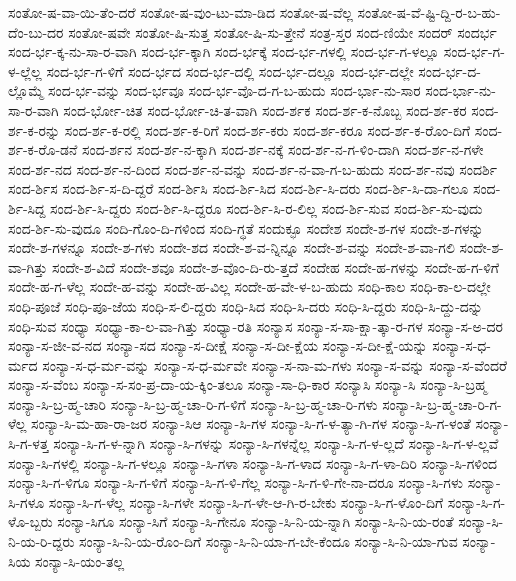 {ಸಂತೋ-ಷ-ವಾ-ಯಿ-ತೆಂ-ದರೆ
ಸಂತೋ-ಷ-ವುಂ-ಟು-ಮಾ-ಡಿದ
ಸಂತೋ-ಷ-ವೆಲ್ಲ
ಸಂತೋ-ಷ-ವೆ-ಷ್ಟಿ-ದ್ದಿ-ರ-ಬ-ಹು-ದೆಂ-ಬು-ದರ
ಸಂತೋ-ಷವೇ
ಸಂತೋ-ಷಿ-ಸುತ್ತ
ಸಂತೋ-ಷಿ-ಸು-ತ್ತೇನೆ
ಸಂತ್ರ-ಸ್ತರ
ಸಂದ-ಣಿಯೇ
ಸಂದರ್
ಸಂದರ್ಭ
ಸಂದ-ರ್ಭ-ಕ್ಕ-ನು-ಸಾ-ರ-ವಾಗಿ
ಸಂದ-ರ್ಭ-ಕ್ಕಾಗಿ
ಸಂದ-ರ್ಭಕ್ಕೆ
ಸಂದ-ರ್ಭ-ಗಳಲ್ಲಿ
ಸಂದ-ರ್ಭ-ಗ-ಳಲ್ಲೂ
ಸಂದ-ರ್ಭ-ಗ-ಳ-ಲ್ಲೆಲ್ಲ
ಸಂದ-ರ್ಭ-ಗ-ಳಿಗೆ
ಸಂದ-ರ್ಭದ
ಸಂದ-ರ್ಭ-ದಲ್ಲಿ
ಸಂದ-ರ್ಭ-ದಲ್ಲೂ
ಸಂದ-ರ್ಭ-ದಲ್ಲೇ
ಸಂದ-ರ್ಭ-ದ-ಲ್ಲೊಮ್ಮೆ
ಸಂದ-ರ್ಭ-ವನ್ನು
ಸಂದ-ರ್ಭವೂ
ಸಂದ-ರ್ಭ-ವೊ-ದ-ಗ-ಬ-ಹುದು
ಸಂದ-ರ್ಭಾ-ನು-ಸಾರ
ಸಂದ-ರ್ಭಾ-ನು-ಸಾ-ರ-ವಾಗಿ
ಸಂದ-ರ್ಭೋ-ಚಿತ
ಸಂದ-ರ್ಭೋ-ಚಿ-ತ-ವಾಗಿ
ಸಂದ-ರ್ಶಕ
ಸಂದ-ರ್ಶ-ಕ-ನೊಬ್ಬ
ಸಂದ-ರ್ಶ-ಕರ
ಸಂದ-ರ್ಶ-ಕ-ರನ್ನು
ಸಂದ-ರ್ಶ-ಕ-ರಲ್ಲಿ
ಸಂದ-ರ್ಶ-ಕ-ರಿಗೆ
ಸಂದ-ರ್ಶ-ಕರು
ಸಂದ-ರ್ಶ-ಕರೂ
ಸಂದ-ರ್ಶ-ಕ-ರೊಂ-ದಿಗೆ
ಸಂದ-ರ್ಶ-ಕ-ರೊ-ಡನೆ
ಸಂದ-ರ್ಶನ
ಸಂದ-ರ್ಶ-ನ-ಕ್ಕಾಗಿ
ಸಂದ-ರ್ಶ-ನಕ್ಕೆ
ಸಂದ-ರ್ಶ-ನ-ಗ-ಳಿಂ-ದಾಗಿ
ಸಂದ-ರ್ಶ-ನ-ಗಳೇ
ಸಂದ-ರ್ಶ-ನದ
ಸಂದ-ರ್ಶ-ನ-ದಿಂದ
ಸಂದ-ರ್ಶ-ನ-ವನ್ನು
ಸಂದ-ರ್ಶ-ನ-ವಾ-ಗ-ಬ-ಹುದು
ಸಂದ-ರ್ಶ-ನವು
ಸಂದರ್ಶಿ
ಸಂದ-ರ್ಶಿಸ
ಸಂದ-ರ್ಶಿ-ಸ-ದಿ-ದ್ದರೆ
ಸಂದ-ರ್ಶಿಸಿ
ಸಂದ-ರ್ಶಿ-ಸಿದ
ಸಂದ-ರ್ಶಿ-ಸಿ-ದರು
ಸಂದ-ರ್ಶಿ-ಸಿ-ದಾ-ಗಲೂ
ಸಂದ-ರ್ಶಿ-ಸಿದ್ದ
ಸಂದ-ರ್ಶಿ-ಸಿ-ದ್ದರು
ಸಂದ-ರ್ಶಿ-ಸಿ-ದ್ದರೂ
ಸಂದ-ರ್ಶಿ-ಸಿ-ರ-ಲಿಲ್ಲ
ಸಂದ-ರ್ಶಿ-ಸುವ
ಸಂದ-ರ್ಶಿ-ಸು-ವುದು
ಸಂದ-ರ್ಶಿ-ಸು-ವುದೂ
ಸಂದಿ-ಗೊಂ-ದಿ-ಗಳಿಂದ
ಸಂದಿ-ಗ್ಧತೆ
ಸಂದುಕ್ಫೂ
ಸಂದೇಶ
ಸಂದೇ-ಶ-ಗಳ
ಸಂದೇ-ಶ-ಗಳನ್ನು
ಸಂದೇ-ಶ-ಗಳನ್ನೂ
ಸಂದೇ-ಶ-ಗಳು
ಸಂದೇ-ಶದ
ಸಂದೇ-ಶ-ವ-ನ್ನಿನ್ನೂ
ಸಂದೇ-ಶ-ವನ್ನು
ಸಂದೇ-ಶ-ವಾ-ಗಲಿ
ಸಂದೇ-ಶ-ವಾ-ಗಿತ್ತು
ಸಂದೇ-ಶ-ವಿದೆ
ಸಂದೇ-ಶವೂ
ಸಂದೇ-ಶ-ವೊಂ-ದಿ-ರು-ತ್ತದೆ
ಸಂದೇಹ
ಸಂದೇ-ಹ-ಗಳನ್ನು
ಸಂದೇ-ಹ-ಗ-ಳಿಗೆ
ಸಂದೇ-ಹ-ಗ-ಳೆಲ್ಲ
ಸಂದೇ-ಹ-ವನ್ನು
ಸಂದೇ-ಹ-ವಿಲ್ಲ
ಸಂದೇ-ಹ-ವೇ-ಳ-ಬ-ಹುದು
ಸಂಧಿ-ಕಾಲ
ಸಂಧಿ-ಕಾ-ಲ-ದಲ್ಲೇ
ಸಂಧಿ-ಪೂಜೆ
ಸಂಧಿ-ಪೂ-ಜೆಯ
ಸಂಧಿ-ಸ-ಲಿ-ದ್ದರು
ಸಂಧಿ-ಸಿದ
ಸಂಧಿ-ಸಿ-ದರು
ಸಂಧಿ-ಸಿ-ದ್ದರು
ಸಂಧಿ-ಸಿ-ದ್ದು-ದನ್ನು
ಸಂಧಿ-ಸುವ
ಸಂಧ್ಯಾ
ಸಂಧ್ಯಾ-ಕಾ-ಲ-ವಾ-ಗಿತ್ತು
ಸಂಧ್ಯಾ-ರತಿ
ಸಂನ್ಯಾಸ
ಸಂನ್ಯಾ-ಸ-ಸಾ-ಕ್ಷಾ-ತ್ಕಾ-ರ-ಗಳ
ಸಂನ್ಯಾ-ಸ-ಅ-ದರ
ಸಂನ್ಯಾ-ಸ-ಜೀ-ವ-ನದ
ಸಂನ್ಯಾ-ಸದ
ಸಂನ್ಯಾ-ಸ-ದೀಕ್ಷೆ
ಸಂನ್ಯಾ-ಸ-ದೀ-ಕ್ಷೆಯ
ಸಂನ್ಯಾ-ಸ-ದೀ-ಕ್ಷೆ-ಯನ್ನು
ಸಂನ್ಯಾ-ಸ-ಧ-ರ್ಮದ
ಸಂನ್ಯಾ-ಸ-ಧ-ರ್ಮ-ವನ್ನು
ಸಂನ್ಯಾ-ಸ-ಧ-ರ್ಮವೇ
ಸಂನ್ಯಾ-ಸ-ನಾ-ಮ-ಗಳು
ಸಂನ್ಯಾ-ಸ-ವನ್ನು
ಸಂನ್ಯಾ-ಸ-ವೆಂದರೆ
ಸಂನ್ಯಾ-ಸ-ವೆಂಬ
ಸಂನ್ಯಾ-ಸ-ಸಂ-ಪ್ರ-ದಾ-ಯ-ಕ್ಕಿಂ-ತಲೂ
ಸಂನ್ಯಾ-ಸಾ-ಧಿ-ಕಾರ
ಸಂನ್ಯಾಸಿ
ಸಂನ್ಯಾ-ಸಿ
ಸಂನ್ಯಾ-ಸಿ-ಬ್ರಹ್ಮ
ಸಂನ್ಯಾ-ಸಿ-ಬ್ರ-ಹ್ಮ-ಚಾರಿ
ಸಂನ್ಯಾ-ಸಿ-ಬ್ರ-ಹ್ಮ-ಚಾ-ರಿ-ಗ-ಳಿಗೆ
ಸಂನ್ಯಾ-ಸಿ-ಬ್ರ-ಹ್ಮ-ಚಾ-ರಿ-ಗಳು
ಸಂನ್ಯಾ-ಸಿ-ಬ್ರ-ಹ್ಮ-ಚಾ-ರಿ-ಗ-ಳೆಲ್ಲ
ಸಂನ್ಯಾ-ಸಿ-ಮ-ಹಾ-ರಾ-ಜರ
ಸಂನ್ಯಾ-ಸಿಆ
ಸಂನ್ಯಾ-ಸಿ-ಗಳ
ಸಂನ್ಯಾ-ಸಿ-ಗ-ಳ-ತ್ಯಾ-ಗಿ-ಗಳ
ಸಂನ್ಯಾ-ಸಿ-ಗ-ಳಂತೆ
ಸಂನ್ಯಾ-ಸಿ-ಗ-ಳತ್ತ
ಸಂನ್ಯಾ-ಸಿ-ಗ-ಳ-ನ್ನಾಗಿ
ಸಂನ್ಯಾ-ಸಿ-ಗಳನ್ನು
ಸಂನ್ಯಾ-ಸಿ-ಗಳನ್ನೆಲ್ಲ
ಸಂನ್ಯಾ-ಸಿ-ಗ-ಳ-ಲ್ಲದೆ
ಸಂನ್ಯಾ-ಸಿ-ಗ-ಳ-ಲ್ಲವೆ
ಸಂನ್ಯಾ-ಸಿ-ಗಳಲ್ಲಿ
ಸಂನ್ಯಾ-ಸಿ-ಗ-ಳಲ್ಲೂ
ಸಂನ್ಯಾ-ಸಿ-ಗಳಾ
ಸಂನ್ಯಾ-ಸಿ-ಗ-ಳಾದ
ಸಂನ್ಯಾ-ಸಿ-ಗ-ಳಾ-ದಿರಿ
ಸಂನ್ಯಾ-ಸಿ-ಗಳಿಂದ
ಸಂನ್ಯಾ-ಸಿ-ಗ-ಳಿಗೂ
ಸಂನ್ಯಾ-ಸಿ-ಗ-ಳಿಗೆ
ಸಂನ್ಯಾ-ಸಿ-ಗ-ಳಿ-ಗೆಲ್ಲ
ಸಂನ್ಯಾ-ಸಿ-ಗ-ಳಿ-ಗೇ-ನಾ-ದರೂ
ಸಂನ್ಯಾ-ಸಿ-ಗಳು
ಸಂನ್ಯಾ-ಸಿ-ಗಳೂ
ಸಂನ್ಯಾ-ಸಿ-ಗ-ಳೆಲ್ಲ
ಸಂನ್ಯಾ-ಸಿ-ಗಳೇ
ಸಂನ್ಯಾ-ಸಿ-ಗ-ಳೇ-ಆ-ಗಿ-ರ-ಬೇಕು
ಸಂನ್ಯಾ-ಸಿ-ಗ-ಳೊಂ-ದಿಗೆ
ಸಂನ್ಯಾ-ಸಿ-ಗ-ಳೊ-ಬ್ಬರು
ಸಂನ್ಯಾ-ಸಿಗೂ
ಸಂನ್ಯಾ-ಸಿಗೆ
ಸಂನ್ಯಾ-ಸಿ-ಗೇನೂ
ಸಂನ್ಯಾ-ಸಿ-ನಿ-ಯ-ನ್ನಾಗಿ
ಸಂನ್ಯಾ-ಸಿ-ನಿ-ಯ-ರಂತೆ
ಸಂನ್ಯಾ-ಸಿ-ನಿ-ಯ-ರಿ-ದ್ದರು
ಸಂನ್ಯಾ-ಸಿ-ನಿ-ಯ-ರೊಂ-ದಿಗೆ
ಸಂನ್ಯಾ-ಸಿ-ನಿ-ಯಾ-ಗ-ಬೇ-ಕೆಂದೂ
ಸಂನ್ಯಾ-ಸಿ-ನಿ-ಯಾ-ಗುವ
ಸಂನ್ಯಾ-ಸಿಯ
ಸಂನ್ಯಾ-ಸಿ-ಯಂ-ತಲ್ಲ
}
